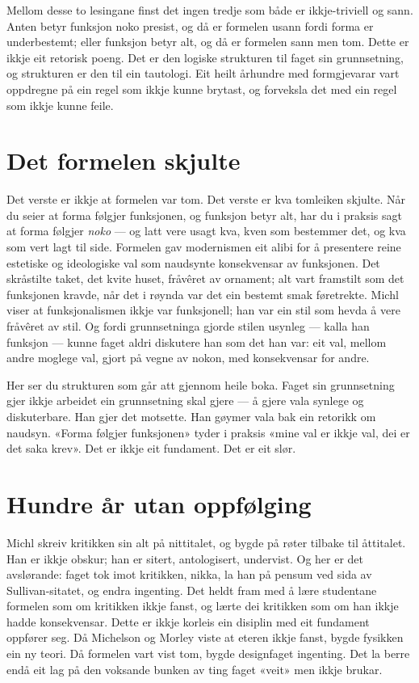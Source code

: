 Mellom desse to lesingane finst det ingen tredje som både er ikkje-triviell og sann. Anten betyr funksjon noko presist, og då er formelen usann fordi forma er underbestemt; eller funksjon betyr alt, og då er formelen sann men tom. Dette er ikkje eit retorisk poeng. Det er den logiske strukturen til faget sin grunnsetning, og strukturen er den til ein tautologi. Eit heilt århundre med formgjevarar vart oppdregne på ein regel som ikkje kunne brytast, og forveksla det med ein regel som ikkje kunne feile.

\section{Det formelen skjulte}

Det verste er ikkje at formelen var tom. Det verste er kva tomleiken skjulte. Når du seier at forma følgjer funksjonen, og funksjon betyr alt, har du i praksis sagt at forma følgjer \emph{noko} — og latt vere usagt kva, kven som bestemmer det, og kva som vert lagt til side. Formelen gav modernismen eit alibi for å presentere reine estetiske og ideologiske val som naudsynte konsekvensar av funksjonen. Det skråstilte taket, det kvite huset, fråvêret av ornament; alt vart framstilt som det funksjonen kravde, når det i røynda var det ein bestemt smak føretrekte. Michl viser at funksjonalismen ikkje var funksjonell; han var ein stil som hevda å vere fråvêret av stil. Og fordi grunnsetninga gjorde stilen usynleg — kalla han funksjon — kunne faget aldri diskutere han som det han var: eit val, mellom andre moglege val, gjort på vegne av nokon, med konsekvensar for andre.

Her ser du strukturen som går att gjennom heile boka. Faget sin grunnsetning gjer ikkje arbeidet ein grunnsetning skal gjere — å gjere vala synlege og diskuterbare. Han gjer det motsette. Han gøymer vala bak ein retorikk om naudsyn. «Forma følgjer funksjonen» tyder i praksis «mine val er ikkje val, dei er det saka krev». Det er ikkje eit fundament. Det er eit slør.

\section{Hundre år utan oppfølging}

Michl skreiv kritikken sin alt på nittitalet, og bygde på røter tilbake til åttitalet. Han er ikkje obskur; han er sitert, antologisert, undervist. Og her er det avslørande: faget tok imot kritikken, nikka, la han på pensum ved sida av Sullivan-sitatet, og endra ingenting. Det heldt fram med å lære studentane formelen som om kritikken ikkje fanst, og lærte dei kritikken som om han ikkje hadde konsekvensar. Dette er ikkje korleis ein disiplin med eit fundament oppfører seg. Då Michelson og Morley viste at eteren ikkje fanst, bygde fysikken ein ny teori. Då formelen vart vist tom, bygde designfaget ingenting. Det la berre endå eit lag på den voksande bunken av ting faget «veit» men ikkje brukar.


